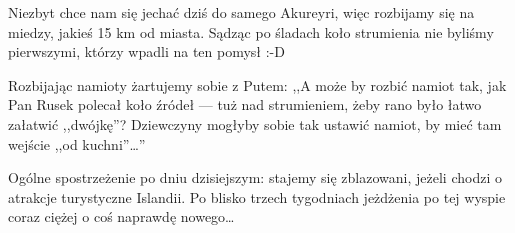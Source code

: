 Niezbyt chce nam się jechać dziś do samego Akureyri, więc rozbijamy się na miedzy, jakieś 15 km od miasta. Sądząc po śladach koło strumienia nie byliśmy pierwszymi, którzy wpadli na ten pomysł :-D

Rozbijając namioty żartujemy sobie z Putem: ,,A może by rozbić namiot tak, jak Pan Rusek polecał koło źródeł --- tuż nad strumieniem, żeby rano było łatwo załatwić ,,dwójkę''? Dziewczyny mogłyby sobie tak ustawić namiot, by mieć tam wejście ,,od kuchni''…''


Ogólne spostrzeżenie po dniu dzisiejszym: stajemy się zblazowani, jeżeli chodzi o atrakcje turystyczne Islandii. Po blisko trzech tygodniach jeżdżenia po tej wyspie coraz ciężej o coś naprawdę nowego…
